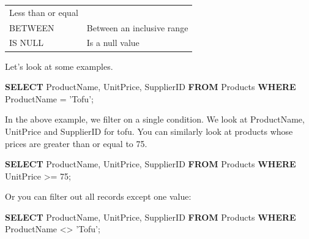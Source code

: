\documentclass[]{book}
\newenvironment{Shaded}{\begin{snugshade}}{\end{snugshade}}
\newcommand{\KeywordTok}[1]{\textcolor[rgb]{0.13,0.29,0.53}{\textbf{{#1}}}}
\newcommand{\DecValTok}[1]{\textcolor[rgb]{0.00,0.00,0.81}{{#1}}}
\newcommand{\StringTok}[1]{\textcolor[rgb]{0.31,0.60,0.02}{{#1}}}
\newcommand{\NormalTok}[1]{{#1}}
\theoremstyle{definition}
\theoremstyle{definition}
\theoremstyle{remark}
\begin{document}
\begin{longtable}[]{@{}ll@{}}
\begin{minipage}[t]{0.18\columnwidth}
Less than or equal\strut
\end{minipage}\tabularnewline
\begin{minipage}[t]{0.13\columnwidth}\raggedright\strut
BETWEEN\strut
\end{minipage} & \begin{minipage}[t]{0.18\columnwidth}\raggedright\strut
Between an inclusive range\strut
\end{minipage}\tabularnewline
\begin{minipage}[t]{0.13\columnwidth}\raggedright\strut
IS NULL\strut
\end{minipage} & \begin{minipage}[t]{0.18\columnwidth}\raggedright\strut
Is a null value\strut
\end{minipage}\tabularnewline
\bottomrule
\end{longtable}

Let's look at some examples.

\begin{Shaded}
\begin{Highlighting}[]
\KeywordTok{SELECT} \NormalTok{ProductName,}
\NormalTok{UnitPrice,}
\NormalTok{SupplierID}
\KeywordTok{FROM} \NormalTok{Products}
\KeywordTok{WHERE} \NormalTok{ProductName = }\StringTok{'Tofu'}\NormalTok{;}
\end{Highlighting}
\end{Shaded}

In the above example, we filter on a single condition. We look at
ProductName, UnitPrice and SupplierID for tofu. You can similarly look
at products whose prices are greater than or equal to 75.

\begin{Shaded}
\begin{Highlighting}[]
\KeywordTok{SELECT} \NormalTok{ProductName,}
\NormalTok{UnitPrice,}
\NormalTok{SupplierID}
\KeywordTok{FROM} \NormalTok{Products}
\KeywordTok{WHERE} \NormalTok{UnitPrice >= }\DecValTok{75}\NormalTok{;}
\end{Highlighting}
\end{Shaded}

Or you can filter out all records except one value:

\begin{Shaded}
\begin{Highlighting}[]
\KeywordTok{SELECT} \NormalTok{ProductName,}
\NormalTok{UnitPrice,}
\NormalTok{SupplierID}
\KeywordTok{FROM} \NormalTok{Products}
\KeywordTok{WHERE} \NormalTok{ProductName <> }\StringTok{'Tofu'}\NormalTok{;}
\end{Highlighting}
\end{Shaded}
\end{document}
